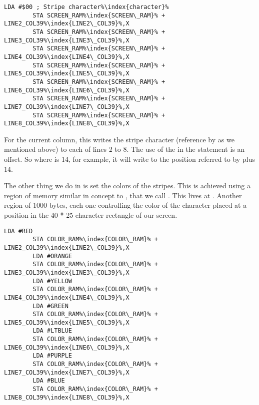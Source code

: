 \begin{lstlisting}[caption=In \icode{DrawStripesBehindTitle\index{DrawStripesBehindTitle}},escapechar=\%]
        LDA #$00 ; Stripe character%\index{character}%
        STA SCREEN_RAM%\index{SCREEN\_RAM}% + LINE2_COL39%\index{LINE2\_COL39}%,X
        STA SCREEN_RAM%\index{SCREEN\_RAM}% + LINE3_COL39%\index{LINE3\_COL39}%,X
        STA SCREEN_RAM%\index{SCREEN\_RAM}% + LINE4_COL39%\index{LINE4\_COL39}%,X
        STA SCREEN_RAM%\index{SCREEN\_RAM}% + LINE5_COL39%\index{LINE5\_COL39}%,X
        STA SCREEN_RAM%\index{SCREEN\_RAM}% + LINE6_COL39%\index{LINE6\_COL39}%,X
        STA SCREEN_RAM%\index{SCREEN\_RAM}% + LINE7_COL39%\index{LINE7\_COL39}%,X
        STA SCREEN_RAM%\index{SCREEN\_RAM}% + LINE8_COL39%\index{LINE8\_COL39}%,X
\end{lstlisting}

For the current column, this writes the stripe character (reference by  as we mentioned above) to each of lines
2 to 8. The use of the  in the  statement is an offset. So where  is 14, for example,
it will write to the position referred to by  plus 14.



The other thing we do in  is set the colors of the stripes. This is achieved using a region of memory
similar in concept to , that we call . This lives at . Another 
region of 1000 bytes, each one controlling the color of the character placed at a position in the 40 * 25 character rectangle
of our screen.

\begin{lstlisting}[caption=In \icode{DrawStripesBehindTitle\index{DrawStripesBehindTitle}},escapechar=\%]
        LDA #RED
        STA COLOR_RAM%\index{COLOR\_RAM}% + LINE2_COL39%\index{LINE2\_COL39}%,X
        LDA #ORANGE
        STA COLOR_RAM%\index{COLOR\_RAM}% + LINE3_COL39%\index{LINE3\_COL39}%,X
        LDA #YELLOW
        STA COLOR_RAM%\index{COLOR\_RAM}% + LINE4_COL39%\index{LINE4\_COL39}%,X
        LDA #GREEN
        STA COLOR_RAM%\index{COLOR\_RAM}% + LINE5_COL39%\index{LINE5\_COL39}%,X
        LDA #LTBLUE
        STA COLOR_RAM%\index{COLOR\_RAM}% + LINE6_COL39%\index{LINE6\_COL39}%,X
        LDA #PURPLE
        STA COLOR_RAM%\index{COLOR\_RAM}% + LINE7_COL39%\index{LINE7\_COL39}%,X
        LDA #BLUE
        STA COLOR_RAM%\index{COLOR\_RAM}% + LINE8_COL39%\index{LINE8\_COL39}%,X
\end{lstlisting}

